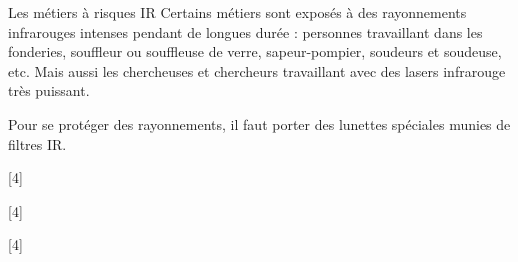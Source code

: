 \begin{doc}{Les métiers à risques IR}
  Certains métiers sont exposés à des rayonnements infrarouges intenses pendant de longues durée : personnes travaillant dans les fonderies, souffleur ou souffleuse de verre, sapeur-pompier, soudeurs et soudeuse, etc.
  Mais aussi les chercheuses et chercheurs travaillant avec des lasers infrarouge très puissant.

  Pour se protéger des rayonnements, il faut porter des lunettes spéciales munies de filtres IR.
\end{doc}


[4]

\newpage
{}[4]

[4]